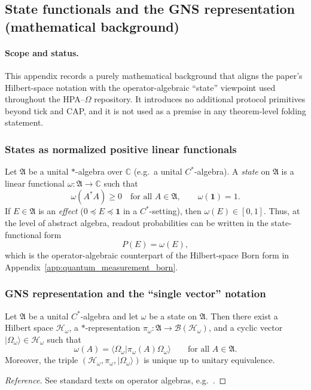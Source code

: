 \subsection{State functionals and the GNS representation (mathematical background)}
\label{app:state_gns_background}

\paragraph{Scope and status.}
\AuditTag This appendix records a purely mathematical background that aligns the paper's Hilbert-space notation with the operator-algebraic ``state'' viewpoint used throughout the HPA--$\Omega$ repository.
It introduces no additional protocol primitives beyond tick and CAP, and it is not used as a premise in any theorem-level folding statement.

\subsubsection{States as normalized positive linear functionals}
\label{subsec:state_functional_definition}

Let $\mathfrak{A}$ be a unital $*$-algebra over $\mathbb{C}$ (e.g.\ a unital $C^{*}$-algebra).
A \emph{state} on $\mathfrak{A}$ is a linear functional $\omega:\mathfrak{A}\to\mathbb{C}$ such that
\[
\omega(A^{*}A)\ge 0\quad\text{for all }A\in\mathfrak{A},
\qquad
\omega(\mathbf{1})=1.
\]
If $E\in\mathfrak{A}$ is an \emph{effect} ($0\preceq E\preceq \mathbf{1}$ in a $C^{*}$-setting), then $\omega(E)\in[0,1]$.
Thus, at the level of abstract algebra, readout probabilities can be written in the state-functional form
\[
P(E)=\omega(E),
\]
which is the operator-algebraic counterpart of the Hilbert-space Born form in Appendix~\ref{app:quantum_measurement_born}.

\subsubsection{GNS representation and the ``single vector'' notation}
\label{subsec:gns_representation}

\begin{proposition}
\label{prop:gns_representation_standard}
Let $\mathfrak{A}$ be a unital $C^{*}$-algebra and let $\omega$ be a state on $\mathfrak{A}$.
Then there exist a Hilbert space $\mathcal{H}_{\omega}$, a $*$-representation $\pi_{\omega}:\mathfrak{A}\to\mathcal{B}(\mathcal{H}_{\omega})$, and a cyclic vector $|\Omega_{\omega}\rangle\in\mathcal{H}_{\omega}$ such that
\[
\omega(A)=\langle \Omega_{\omega}|\pi_{\omega}(A)\Omega_{\omega}\rangle
\qquad\text{for all }A\in\mathfrak{A}.
\]
Moreover, the triple $(\mathcal{H}_{\omega},\pi_{\omega},|\Omega_{\omega}\rangle)$ is unique up to unitary equivalence.
\end{proposition}
\begin{proof}[Reference]
See standard texts on operator algebras, e.g.\ \cite{BratteliRobinson1987,KadisonRingrose1997}.
\end{proof}

